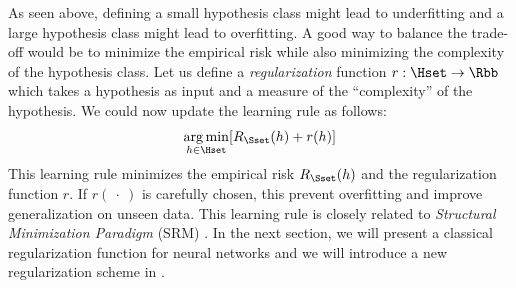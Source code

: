 As seen above, defining a small hypothesis class might lead to underfitting and a large hypothesis class might lead to overfitting.
A good way to balance the trade-off would be to minimize the empirical risk while also minimizing the complexity of the hypothesis class.
Let us define a \emph{regularization} function $r: \Hset \rightarrow \Rbb$ which takes a hypothesis as input and a measure of the ``complexity'' of the hypothesis.
We could now update the learning rule as follows:
\begin{equation}
  \argmin_{h \in \Hset} \left[ R_\Sset(h) + r(h) \right]
\end{equation}
This learning rule minimizes the empirical risk $R_\Sset(h)$ and the regularization function $r$. If $r(\ \cdot\ )$ is carefully chosen, this prevent overfitting and improve generalization on unseen data.
This learning rule is closely related to \emph{Structural Minimization Paradigm} (SRM) \cite{shalev2014understanding}.
In the next section, we will present a classical regularization function for neural networks and we will introduce a new regularization scheme in .













